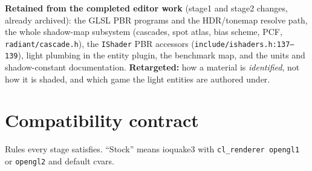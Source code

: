 \documentclass[11pt,a4paper]{article}
\begin{document}
\textbf{Retained from the completed editor work} (stage1 and stage2 changes, already archived):
the GLSL PBR programs and the HDR/tonemap resolve path, the whole shadow-map subsystem (cascades,
spot atlas, bias scheme, PCF, \texttt{radiant/cascade.h}), the \texttt{IShader} PBR accessors
(\texttt{include/ishaders.h:137--139}), light plumbing in the entity plugin, the benchmark map, and
the units and shadow-constant documentation. \textbf{Retargeted:} how a material is
\emph{identified}, not how it is shaded, and which game the light entities are authored under.

\section{Compatibility contract}\label{sec:contract}

Rules every stage satisfies. ``Stock'' means ioquake3 with \texttt{cl\_renderer opengl1} or
\texttt{opengl2} and default cvars.
\end{document}
